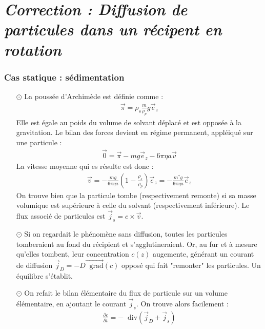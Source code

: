 \documentclass{report}
\newcommand*\diver{\mathop{}\!\mathrm{div}}
\newcommand*\grad{\mathop{}\!\mathrm{grad}}
\begin{document}
\newpage

\section*{\textit{Correction : Diffusion de particules dans un récipent en rotation}}

\subsubsection*{Cas statique : sédimentation}

\begin{itemize}
	
	\item[$\odot$] La poussée d'Archimède est définie comme :
	\begin{align*}
		\vec{\pi}=\rho_s\frac{m}{\rho_p}g\vec{e}_z
	\end{align*}
	Elle est égale au poids du volume de solvant déplacé et est opposée à la gravitation. 
	Le bilan des forces devient en régime permanent, appléiqué sur une particule :
	\begin{align*}
		\vec{0} = \vec{\pi} -mg\vec{e}_z-6\pi\eta a\vec{v}
	\end{align*}
	La vitesse moyenne qui es résulte est donc :
	\begin{align*}
		\vec{v} = -\frac{mg}{6\pi\eta a}\left(1-\frac{\rho_s}{\rho_p} \right)\vec{e}_z=-\frac{m^*g}{6\pi\eta a}\vec{e}_z
	\end{align*}
	On trouve bien que la particule tombe (respectivement remonte) si sa masse volumique est supérieure à celle du solvant (respectivement inférieure).
	Le flux associé de particules est $\vec{j}_s=c\times\vec{v}$.
	
	\item[$\odot$] Si on regardait le phénomène sans diffusion, toutes les particules tomberaient au fond du récipient et s'agglutineraient. Or, au fur et à mesure qu'elles tombent, leur concentration $c(z)$ augemente, générant un courant de diffusion $\vec{j}_D=-D\vec{\grad}(c)$ opposé qui fait "remonter" les particules. Un équilibre s'établit.
	
	\item[$\odot$] On refait le bilan élémentaire du flux de particule sur un volume élémentaire, en ajoutant le courant $\vec{j}_s$. On trouve alors facilement :
	\begin{align*}
		\frac{\partial c}{\partial t}=-\diver(\vec{j}_D+\vec{j}_s)
	\end{align*}
	

\end{itemize}
\end{document}
